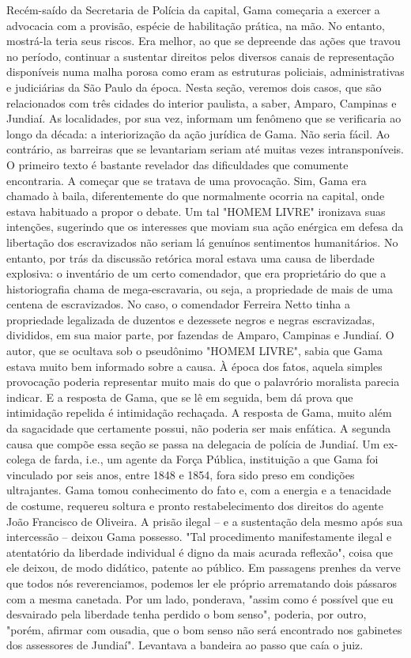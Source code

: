 {\small\noindent
Recém-saído da Secretaria de Polícia da capital, Gama começaria a
exercer a advocacia com a provisão, espécie de habilitação prática, na
mão. No entanto, mostrá-la teria seus riscos. Era melhor, ao que se
depreende das ações que travou no período, continuar a sustentar
direitos pelos diversos canais de representação disponíveis numa malha
porosa como eram as estruturas policiais, administrativas e judiciárias
da São Paulo da época. Nesta seção, veremos dois casos, que são
relacionados com três cidades do interior paulista, a saber, Amparo,
Campinas e Jundiaí. As localidades, por sua vez, informam um fenômeno
que se verificaria ao longo da década: a interiorização da ação jurídica
de Gama. Não seria fácil. Ao contrário, as barreiras que se levantariam
seriam até muitas vezes intransponíveis. O primeiro texto é bastante
revelador das dificuldades que comumente encontraria. A começar que se
tratava de uma provocação. Sim, Gama era chamado à baila, diferentemente
do que normalmente ocorria na capital, onde estava habituado a propor o
debate. Um tal "HOMEM LIVRE" ironizava suas intenções, sugerindo que os
interesses que moviam sua ação enérgica em defesa da libertação dos
escravizados não seriam lá genuínos sentimentos humanitários. No
entanto, por trás da discussão retórica moral estava uma causa de
liberdade explosiva: o inventário de um certo comendador, que era
proprietário do que a historiografia chama de mega-escravaria, ou seja,
a propriedade de mais de uma centena de escravizados. No caso, o
comendador Ferreira Netto tinha a propriedade legalizada de duzentos e
dezessete negros e negras escravizadas, divididos, em sua maior parte,
por fazendas de Amparo, Campinas e Jundiaí. O autor, que se ocultava sob
o pseudônimo "HOMEM LIVRE", sabia que Gama estava muito bem informado
sobre a causa. À época dos fatos, aquela simples provocação poderia
representar muito mais do que o palavrório moralista parecia indicar. E
a resposta de Gama, que se lê em seguida, bem dá prova que intimidação
repelida é intimidação rechaçada. A resposta de Gama, muito além da
sagacidade que certamente possui, não poderia ser mais enfática. A
segunda causa que compõe essa seção se passa na delegacia de polícia de
Jundiaí. Um ex-colega de farda, i.e., um agente da Força Pública,
instituição a que Gama foi vinculado por seis anos, entre 1848 e 1854,
fora sido preso em condições ultrajantes. Gama tomou conhecimento do
fato e, com a energia e a tenacidade de costume, requereu soltura e
pronto restabelecimento dos direitos do agente João Francisco de
Oliveira. A prisão ilegal -- e a sustentação dela mesmo após sua
intercessão -- deixou Gama possesso. "Tal procedimento manifestamente
ilegal e atentatório da liberdade individual é digno da mais acurada
reflexão", coisa que ele deixou, de modo didático, patente ao público.
Em passagens prenhes da verve que todos nós reverenciamos, podemos ler
ele próprio arrematando dois pássaros com a mesma canetada. Por um lado,
ponderava, "assim como é possível que eu desvairado pela liberdade tenha
perdido o bom senso", poderia, por outro, "porém, afirmar com ousadia,
que o bom senso não será encontrado nos gabinetes dos assessores de
Jundiaí". Levantava a bandeira ao passo que caía o juiz.}

